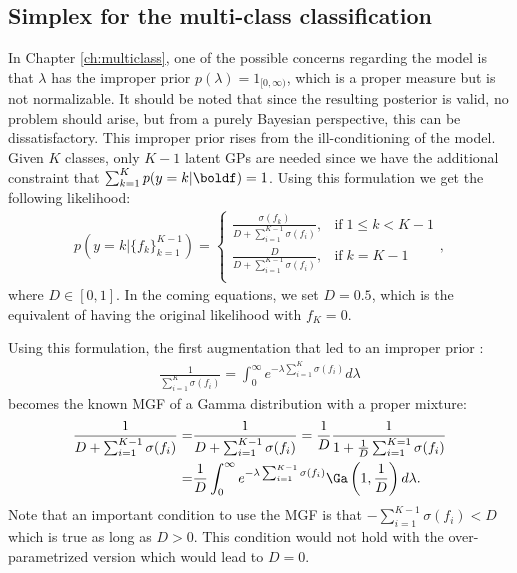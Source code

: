 \subsection{Simplex for the multi-class classification}
\label{sec:simplex}
In Chapter \ref{ch:multiclass}, one of the possible concerns regarding the model is that $\lambda$ has the improper prior $p(\lambda) = 1_{[0,\infty)}$, which is a proper measure but is not normalizable.
It should be noted that since the resulting posterior is valid, no problem should arise, but from a purely Bayesian perspective, this can be dissatisfactory.
This improper prior rises from the ill-conditioning of the model.
Given $K$ classes, only $K-1$ latent \ac{GPs} are needed since we have the additional constraint that $\sum_{k=1}^K p(y=k|\boldf) = 1$.
Using this formulation we get the following likelihood:
\begin{align}
    p(y=k|\{f_k\}_{k=1}^{K-1}) = \left\{
        \begin{array}{cc}
            \frac{\sigma(f_k)}{D + \sum_{i=1}^{K-1}\sigma(f_i)}, & \mathrm{if}\; 1 \leq k < K - 1\\
            \frac{D}{D + \sum_{i=1}^{K-1}\sigma(f_i)}, & \mathrm{if}\; k = K - 1 \\
    \end{array}
    \right.,
\end{align}
where $D \in [0, 1]$.
In the coming equations, we set $D=0.5$, which is the equivalent of having the original likelihood with $f_K = 0$.

Using this formulation, the first augmentation that led to an improper prior :
\begin{align*}
    \frac{1}{ \sum_{i=1}^{K} \sigma(f_i)} = \int_0^\infty e^{-\lambda  \sum_{i=1}^{K} \sigma(f_i)}d\lambda
\end{align*}
becomes the known \ac{MGF} of a Gamma distribution with a proper mixture:
\begin{align*}
    \frac{1}{D + \sum_{i=1}^{K-1} \sigma(f_i)} =& \frac{1}{D + \sum_{i=1}^{K-1} \sigma(f_i)} = \frac{1}{D}\frac{1}{1+\frac{1}{D}\sum_{i=1}^{K=1}\sigma(f_i)}\\
    =& \frac{1}{D}\int_0^\infty e^{-\lambda \sum_{i=1}^{K-1} \sigma(f_i)}\Ga \left(1, \frac{1}{D}\right)d\lambda.
\end{align*}
Note that an important condition to use the \ac{MGF} is that $-\sum_{i=1}^{K-1} \sigma(f_i) < D$ which is true as long as $D > 0$.
This condition would not hold with the over-parametrized version which would lead to $D=0$.

